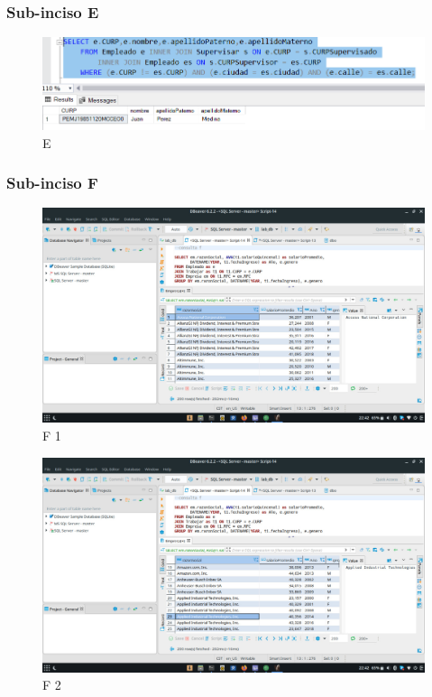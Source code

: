 \documentclass[a4paper, 12pt]{report}
\begin{document}
\subsubsection*{Sub-inciso E}
    \begin{figure}
        \includegraphics[width=\textwidth]
            {img/E.png}\hfill
    \caption{E}
    \end{figure}

\subsubsection*{Sub-inciso F}
    \begin{figure}
        \includegraphics[width=\textwidth]
            {img/f1.jpeg}\hfill
    \caption{F 1}
    \end{figure}
    \begin{figure}
        \includegraphics[width=\textwidth]
            {img/f2.jpeg}\hfill
    \caption{F 2}
    \end{figure}
\end{document}
